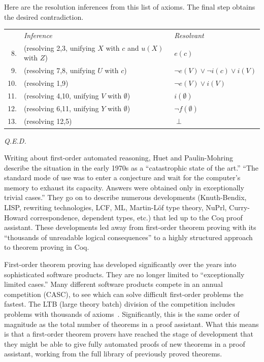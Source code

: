 \documentclass{llncs}
\begin{document}
{{Here are the resolution inferences from this list of axioms. The final step obtains the
desired contradiction. 

\smallskip
\begin{tabular}{lll}
{\it }&{\it Inference}&{\it Resolvant}\\
~8.&(resolving 2,3, unifying $X$ with $c$ and $u(X)$ with $Z$)~~~~~&$e(c)$\\
~9.&(resolving 7,8, unifying $U$ with $c$)~~~&$\lnot e(V) \lor \lnot i(c) \lor i(V)$\\
10.&(resolving 1,9)~~~&$\lnot e(V) \lor  i(V)$\\
11.&(resolving 4,10, unifying $V$ with $\emptyset$)~~~&$i(\emptyset)$\\
12.&(resolving 6,11, unifying $Y$ with $\emptyset$)~~~&$\lnot f(\emptyset)$\\
13.&(resolving 12,5)~~~&$\perp$\\
\end{tabular}

{{\it Q.E.D.}}

}}

\newpage


Writing about first-order automated reasoning, Huet and Paulin-Mohring
\cite{Coq} describe the situation in the early 1970s as a
``catastrophic state of the art.''  ``The standard mode of use was to
enter a conjecture and wait for the computer's memory to exhaust its
capacity.  Answers were obtained only in exceptionally trivial
cases.'' %
They go on to describe numerous developments (Knuth-Bendix, LISP,
rewriting technologies, LCF, ML, Martin-L\"of type theory, NuPrl,
Curry-Howard correspondence, dependent types, etc.) that led up to the
Coq proof assistant.  These developments led away from first-order
theorem proving with its ``thousands of unreadable logical
consequences'' to a highly structured approach to theorem proving in Coq.


First-order theorem proving has developed significantly over the years
into sophisticated software products.  They are no longer limited to
``exceptionally limited cases.''   Many different
software products compete in an annual competition (CASC), to see
which can solve difficult first-order problems the fastest.  The LTB
(large theory batch) division of the competition includes problems
with thousands of axioms~\cite{PSST}.  Significantly, this is the same order of
magnitude as the total number of theorems in a proof assistant.  What
this means is that a first-order theorem provers have reached the
stage of development that they might be able to give fully automated
proofs of new theorems in a proof assistant, working from the full
library of previously proved theorems.
\end{document}
